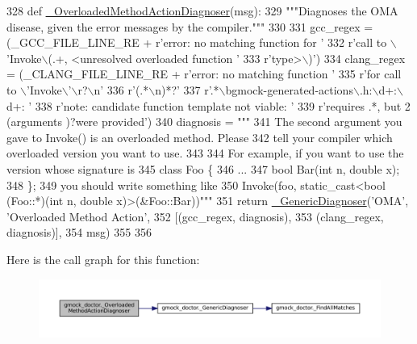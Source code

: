 \begin{DoxyCode}
328 \textcolor{keyword}{def }\hyperlink{namespacegmock__doctor_a830bf3bac2d58666d82a75dfa0865c42}{\_OverloadedMethodActionDiagnoser}(msg):
329   \textcolor{stringliteral}{"""Diagnoses the OMA disease, given the error messages by the compiler."""}
330 
331   gcc\_regex = (\_GCC\_FILE\_LINE\_RE + \textcolor{stringliteral}{r'error: no matching function for '}
332                \textcolor{stringliteral}{r'call to \(\backslash\)'Invoke\(\backslash\)(.+, <unresolved overloaded function '}
333                \textcolor{stringliteral}{r'type>\(\backslash\))'})
334   clang\_regex = (\_CLANG\_FILE\_LINE\_RE + \textcolor{stringliteral}{r'error: no matching function '}
335                  \textcolor{stringliteral}{r'for call to \(\backslash\)'Invoke\(\backslash\)'\(\backslash\)r?\(\backslash\)n'}
336                  \textcolor{stringliteral}{r'(.*\(\backslash\)n)*?'}
337                  \textcolor{stringliteral}{r'.*\(\backslash\)bgmock-generated-actions\(\backslash\).h:\(\backslash\)d+:\(\backslash\)d+: '}
338                  \textcolor{stringliteral}{r'note: candidate function template not viable: '}
339                  \textcolor{stringliteral}{r'requires .*, but 2 (arguments )?were provided'})
340   diagnosis = \textcolor{stringliteral}{"""}
341 \textcolor{stringliteral}{The second argument you gave to Invoke() is an overloaded method.  Please}
342 \textcolor{stringliteral}{tell your compiler which overloaded version you want to use.}
343 \textcolor{stringliteral}{}
344 \textcolor{stringliteral}{For example, if you want to use the version whose signature is}
345 \textcolor{stringliteral}{  class Foo \{}
346 \textcolor{stringliteral}{    ...}
347 \textcolor{stringliteral}{    bool Bar(int n, double x);}
348 \textcolor{stringliteral}{  \};}
349 \textcolor{stringliteral}{you should write something like}
350 \textcolor{stringliteral}{  Invoke(foo, static\_cast<bool (Foo::*)(int n, double x)>(&Foo::Bar))"""}
351   \textcolor{keywordflow}{return} \hyperlink{namespacegmock__doctor_af5023d3e12d1f4a7171c6b035783de84}{\_GenericDiagnoser}(\textcolor{stringliteral}{'OMA'}, \textcolor{stringliteral}{'Overloaded Method Action'},
352                            [(gcc\_regex, diagnosis),
353                             (clang\_regex, diagnosis)],
354                            msg)
355 
356 
\end{DoxyCode}
Here is the call graph for this function\+:
\nopagebreak
\begin{figure}[H]
\begin{center}
\leavevmode
\includegraphics[width=350pt]{namespacegmock__doctor_a830bf3bac2d58666d82a75dfa0865c42_cgraph}
\end{center}
\end{figure}
